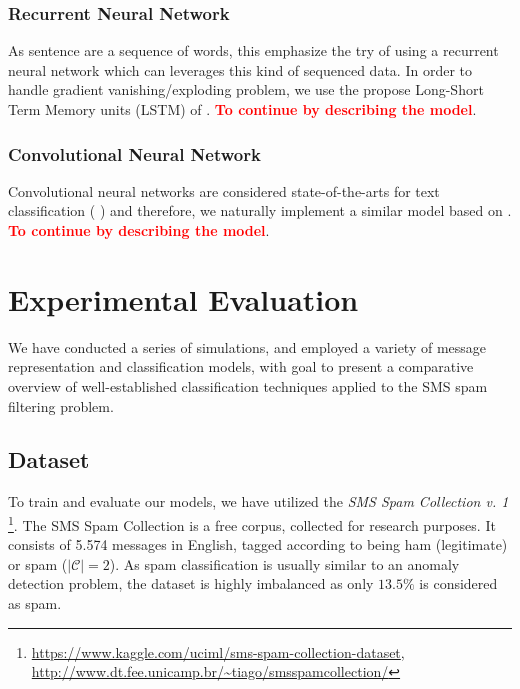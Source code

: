 \documentclass[letterpaper]{article}
\newcommand{\note}[1]{\textbf{\textcolor{red}{#1}}}
\begin{document}
\subsubsection{Recurrent Neural Network} \label{Recurrent Neural Network}
As sentence are a sequence of words, this emphasize the try of using a recurrent neural network which can leverages this kind of sequenced data. In order to handle gradient vanishing/exploding problem, we use the propose Long-Short Term Memory units (LSTM) of \cite{hochreiter1997long}. \note{To continue by describing the model}.

\subsubsection{Convolutional Neural Network} \label{Convolutional Neural Network}
Convolutional neural networks are considered state-of-the-arts for text classification (\cite{CaoLLW17} \cite{kim2014convolutional} \cite{zhang2015understanding} \cite{XiaoC16}) and therefore, we naturally implement a similar model based on \cite{kim2014convolutional}. \note{To continue by describing the model}.


\section{Experimental Evaluation} \label{Experimental Evaluation}

We have conducted a series of simulations, and employed a variety of message representation and classification models, with goal to present a comparative overview of well-established classification techniques applied to the SMS spam filtering problem. 

\subsection{Dataset}  \label{Dataset}

To train and evaluate our models, we have utilized the \emph{SMS Spam Collection v. 1} \footnote{\url{https://www.kaggle.com/uciml/sms-spam-collection-dataset}, \\ \url{http://www.dt.fee.unicamp.br/~tiago/smsspamcollection/}}. The SMS Spam Collection is a free corpus, collected for research purposes. It consists of 5.574 messages in English, tagged according to being ham (legitimate) or spam ($|\mathcal{C}| = 2$). As spam classification is usually similar to an anomaly detection problem, the dataset is highly imbalanced as only $13.5\%$ is considered as spam.
\end{document}
